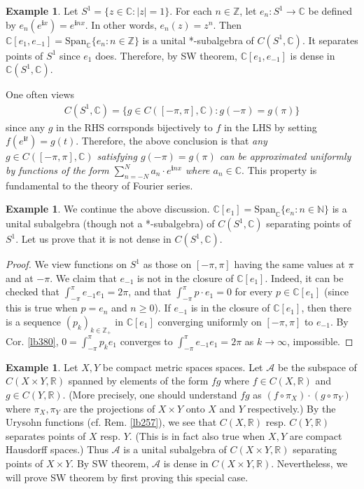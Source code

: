 \documentclass[12pt,b5paper,notitlepage]{article}
\theoremstyle{definition}
\newtheorem{eg}[df]{Example}
\theoremstyle{plain}
\newcommand{\Span}{\mathrm{Span}}
\newcommand{\scr}{\mathscr}
\newcommand{\im}{\mathbf{i}}
\newcommand{\Cbb}{\mathbb C}
\newcommand{\Nbb}{\mathbb N}
\newcommand{\Zbb}{\mathbb Z}
\newcommand{\Rbb}{\mathbb R}
\numberwithin{equation}{section}
\begin{document}
\begin{eg}\label{lb443}
Let $S^1=\{z\in\Cbb:|z|=1\}$. For each $n\in\Zbb$, let $e_n:S^1\rightarrow \Cbb$ be defined by $e_n(e^{\im x})=e^{\im nx}$. In other words, $e_n(z)=z^n$. Then $\Cbb[e_1,e_{-1}]=\Span_\Cbb\{e_n:n\in\Zbb\}$ is a unital *-subalgebra of $C(S^1,\Cbb)$. It separates points of $S^1$ since $e_1$ does. Therefore, by SW theorem, $\Cbb[e_1,e_{-1}]$ is dense in $\Cbb(S^1,\Cbb)$. 

One often views
\begin{align}
C(S^1,\Cbb)=\{g\in C([-\pi,\pi],\Cbb):g(-\pi)=g(\pi)\}
\end{align}
since any $g$ in the RHS corrsponds bijectively to $f$ in the LHS by setting $f(e^{\im t})=g(t)$. Therefore, the above conclusion is that \textit{any $g\in C([-\pi,\pi],\Cbb)$ satisfying $g(-\pi)=g(\pi)$ can be approximated uniformly by functions of the form $\sum_{n=-N}^N a_n\cdot e^{\im nx}$ where $a_n\in\Cbb$}. This property is fundamental  to the theory of Fourier series. \hfill\qedsymbol
\end{eg}


\begin{eg}
We continue the above discussion. $\Cbb[e_1]=\Span_\Cbb\{e_n:n\in\Nbb\}$ is a unital subalgebra (though not a *-subalgebra) of $C(S^1,\Cbb)$ separating points of $S^1$. Let us prove that it is not dense in $C(S^1,\Cbb)$. 
\end{eg}

\begin{proof}
We view functions on $S^1$ as those on $[-\pi,\pi]$ having the same values at $\pi$ and at $-\pi$. We claim that $e_{-1}$ is not in the closure of $\Cbb[e_1]$. Indeed, it can be checked that $\int_{-\pi}^{\pi}e_{-1}e_1=2\pi$, and that $\int_{-\pi}^{\pi} p\cdot e_1=0$ for every $p\in\Cbb[e_1]$ (since this is true when $p=e_n$ and $n\geq0$). If $e_{-1}$ is in the closure of $\Cbb[e_1]$, then there is a sequence $(p_k)_{k\in\Zbb_+}$ in $\Cbb[e_1]$ converging uniformly on $[-\pi,\pi]$ to $e_{-1}$. By Cor. \ref{lb380}, $0=\int_{-\pi}^\pi p_ke_1$ converges  to $\int_{-\pi}^\pi e_{-1}e_1=2\pi$ as $k\rightarrow\infty$, impossible.  
\end{proof}

\begin{eg}
Let $X,Y$ be compact metric spaces spaces. Let $\scr A$ be the subspace of $C(X\times Y,\Rbb)$ spanned by elements of the form $fg$ where $f\in C(X,\Rbb)$ and $g\in C(Y,\Rbb)$. (More precisely, one should understand $fg$ as $(f\circ\pi_X)\cdot(g\circ\pi_Y)$ where $\pi_X,\pi_Y$ are the projections of $X\times Y$ onto $X$ and $Y$ respectively.) By the Urysohn functions (cf. Rem. \ref{lb257}), we see that $C(X,\Rbb)$ resp. $C(Y,\Rbb)$ separates points of $X$ resp. $Y$. (This is in fact also true when $X,Y$ are compact Hausdorff spaces.) Thus $\scr A$ is a unital subalgebra of $C(X\times Y,\Rbb)$ separating points of $X\times Y$. By SW theorem, $\scr A$ is dense in $C(X\times Y,\Rbb)$. Nevertheless, we will prove SW theorem by first proving this special case.
\end{eg}
\end{document}
